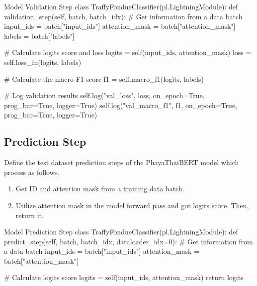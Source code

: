 \documentclass[12pt, a4paper]{article}
\begin{document}
                \begin{codeblock}{Model Validation Step}
                    class TraffyFondueClassifier(pl.LightningModule):
                        def validation_step(self, batch, batch_idx):
                            # Get information from a data batch
                            input_ids = batch["input_ids"]
                            attention_mask = batch["attention_mask"]
                            labels = batch["labels"]

                            # Calculate logits score and loss
                            logits = self(input_ids, attention_mask)
                            loss = self.loss_fn(logits, labels)

                            # Calculate the macro F1 score
                            f1 = self.macro_f1(logits, labels)

                            # Log validation results
                            self.log("val_loss", loss, on_epoch=True, prog_bar=True, logger=True)
                            self.log("val_macro_f1", f1, on_epoch=True, prog_bar=True, logger=True)
                \end{codeblock}

            \subsection{Prediction Step}
                Define the test dataset prediction steps of the PhayaThaiBERT model which process as follows.
                \begin{enumerate}
                    \item Get ID and attention mask from a training data batch.
                    \item Utilize attention mask in the model forward pass and got logits score. Then, return it.
                \end{enumerate}

                \begin{codeblock}{Model Prediction Step}
                    class TraffyFondueClassifier(pl.LightningModule):
                        def predict_step(self, batch, batch_idx, dataloader_idx=0):
                            # Get information from a data batch
                            input_ids = batch["input_ids"]
                            attention_mask = batch["attention_mask"]

                            # Calculate logits score
                            logits = self(input_ids, attention_mask)
                            return logits
                \end{codeblock}
\end{document}
